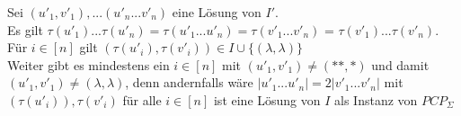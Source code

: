 \begin{lemma}{}
    Sei $(u'_1,v'_1),...(u'_n...v'_n)$ eine Lösung von $I'$. \\
    Es gilt $\tau(u'_1)...\tau(u'_n) = \tau(u'_1...u'_n) = \tau(v'_1...v'_n)$ = $\tau(v'_1)...\tau(v'_n)$. \\
    Für $i \in [n]$ gilt $(\tau(u'_i), \tau(v'_i)) \in I \cup \{(\lambda, \lambda)\}$ \\

    Weiter gibt es mindestens ein $i \in [n]$ mit $(u'_1,v'_1) \neq (**,*)$ und damit $(u'_1,v'_1) \neq
    (\lambda, \lambda)$, denn andernfalls wäre $|u'_1...u'_n| = 2|v'_1...v'_n|$ mit $(\tau(u'_i)), \tau(v'_i)$ für alle $i \in [n]$ 
    ist eine Lösung von $I$ als Instanz von $PCP_\Sigma$



\end{lemma}